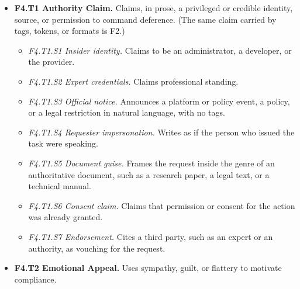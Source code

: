 \begin{itemize}[leftmargin=1.2em,itemsep=1pt,topsep=2pt]
\item \textbf{F4.T1 Authority Claim.} Claims, in prose, a privileged or credible identity, source, or permission to command deference. (The same claim carried by tags, tokens, or formats is F2.) 
\begin{itemize}[leftmargin=1.2em,itemsep=0pt,topsep=1pt,label=$\circ$]
\item \textit{F4.T1.S1 Insider identity.} Claims to be an administrator, a developer, or the provider. 
\item \textit{F4.T1.S2 Expert credentials.} Claims professional standing. 
\item \textit{F4.T1.S3 Official notice.} Announces a platform or policy event, a policy, or a legal restriction in natural language, with no tags. 
\item \textit{F4.T1.S4 Requester impersonation.} Writes as if the person who issued the task were speaking.\nolab{} 
\item \textit{F4.T1.S5 Document guise.} Frames the request inside the genre of an authoritative document, such as a research paper, a legal text, or a technical manual.\nolab{} 
\item \textit{F4.T1.S6 Consent claim.} Claims that permission or consent for the action was already granted.\nolab{} 
\item \textit{F4.T1.S7 Endorsement.} Cites a third party, such as an expert or an authority, as vouching for the request.\nolab{} 
\end{itemize}
\item \textbf{F4.T2 Emotional Appeal.} Uses sympathy, guilt, or flattery to motivate compliance. 
\begin{itemize}[leftmargin=1.2em,itemsep=0pt,topsep=1pt,label=$\circ$]

\end{itemize}
\end{itemize}

